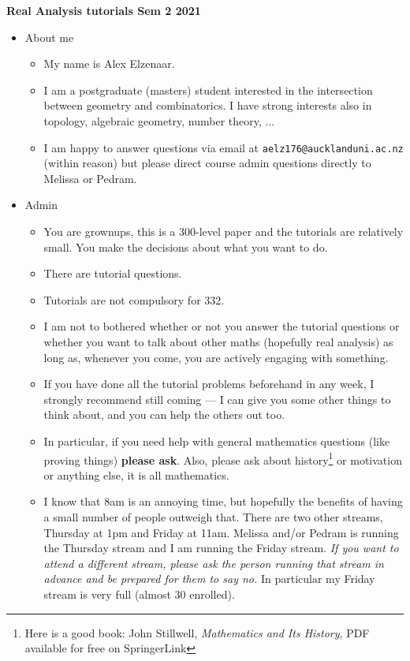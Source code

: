 \documentclass[a4paper,twoside]{article}
\begin{document}
  \begin{center}
    {\huge\textbf{Real Analysis tutorials Sem 2 2021}}
  \end{center}

  \begin{itemize}
  \item About me
  \begin{itemize}
    \item My name is Alex Elzenaar.
    \item I am a postgraduate (masters) student interested in the intersection between geometry and combinatorics. I have strong interests also in topology, algebraic geometry, number theory, ...
    \item I am happy to answer questions via email at \texttt{aelz176@aucklanduni.ac.nz} (within reason) but please direct course admin questions directly to Melissa or Pedram.
  \end{itemize}
  \item Admin
  \begin{itemize}
    \item You are grownups, this is a 300-level paper and the tutorials are relatively small. You make the decisions about what you want to do.
    \item There are tutorial questions.
    \item Tutorials are not compulsory for 332.
    \item I am not to bothered whether or not you answer the tutorial questions or whether you want to talk about other maths (hopefully real analysis) as long as, whenever you come, you are actively engaging with something.
    \item If you have done all the tutorial problems beforehand in any week, I strongly recommend still coming --- I can give you some other things to think about, and you can help the others out too.
    \item In particular, if you need help with general mathematics questions (like proving things) \textbf{please ask}. Also, please ask about history\footnote{Here is a good book: John Stillwell, \textit{Mathematics and Its History}, PDF available for free on SpringerLink} or motivation or anything else, it is all mathematics.
    \item I know that 8am is an annoying time, but hopefully the benefits of having a small number of people outweigh that. There are two other streams, Thursday at 1pm and Friday at 11am. Melissa and/or Pedram is running the Thursday stream and I am running the Friday stream. \emph{If you want to attend a different stream, please ask the person running that stream in advance and be prepared for them to say no.} In particular my Friday stream is very full (almost 30 enrolled).

\end{itemize}
\end{itemize}
\end{document}
